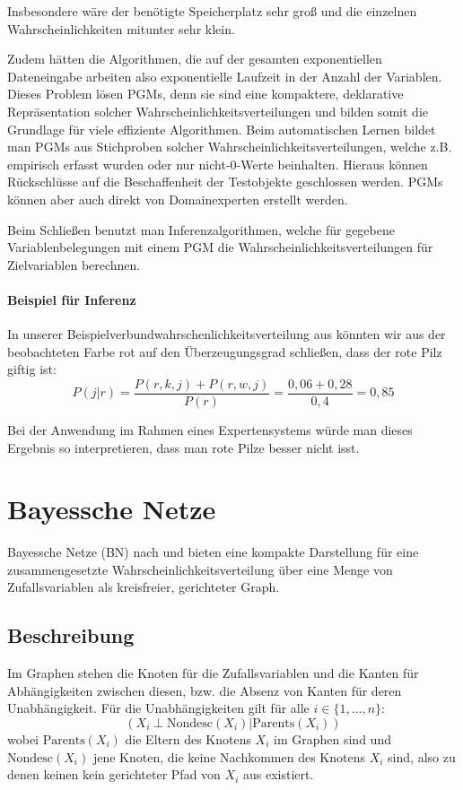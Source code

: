 \documentclass{llncs}
\begin{document}
Insbesondere wäre der benötigte Speicherplatz sehr groß und die einzelnen Wahrscheinlichkeiten mitunter sehr klein. 

Zudem hätten die Algorithmen, die auf der gesamten exponentiellen Dateneingabe arbeiten also exponentielle Laufzeit in der Anzahl der Variablen. Dieses Problem lösen PGMs, denn sie sind eine kompaktere, deklarative Repräsentation solcher Wahrscheinlichkeitsverteilungen und bilden somit die Grundlage für viele effiziente Algorithmen. Beim automatischen Lernen bildet man PGMs aus Stichproben solcher Wahrscheinlichkeitsverteilungen, welche z.B. empirisch erfasst wurden oder nur nicht-$0$-Werte beinhalten. Hieraus können Rückschlüsse auf die Beschaffenheit der Testobjekte geschlossen werden. PGMs können aber auch direkt von Domainexperten erstellt werden. 

Beim Schließen benutzt man Inferenzalgorithmen, welche für gegebene Variablenbelegungen mit einem PGM die Wahrscheinlichkeitsverteilungen für Zielvariablen berechnen. 

\paragraph{Beispiel für Inferenz} In unserer Beispielverbundwahrschenlichkeitsverteilung aus  könnten wir aus der beobachteten Farbe rot auf den Überzeugungsgrad schließen, dass der rote Pilz giftig ist:
\[P(j|r) = \frac{P(r,k,j)+P(r,w,j)}{P(r)} = \frac{0,06+0,28}{0,4} = 0,85\]

Bei der Anwendung im Rahmen eines Expertensystems würde man dieses Ergebnis so interpretieren, dass man rote Pilze besser nicht isst. 

\section{Bayessche Netze}

Bayessche Netze (BN) nach \cite{pearl1988probabilistic} und \cite{koller2009probabilistic} bieten eine kompakte Darstellung für eine zusammengesetzte Wahrscheinlichkeitsverteilung über eine Menge von Zufallsvariablen als kreisfreier, gerichteter Graph. 

\subsection{Beschreibung}

Im Graphen stehen die Knoten für die Zufallsvariablen und die Kanten für Abhängigkeiten zwischen diesen, bzw. die Absenz von Kanten für deren Unabhängigkeit. Für die Unabhängigkeiten gilt für alle $i \in \{1,\dots,n\}$:
\[ ( X_i \perp \mbox{Nondesc}(X_i) | \mbox{Parents}(X_i) )\]
wobei $\mbox{Parents}(X_i)$ die Eltern des Knotens $X_i$ im Graphen sind und $\mbox{Nondesc}(X_i)$ jene Knoten, die keine Nachkommen des Knotens $X_i$ sind, also zu denen keinen kein gerichteter Pfad von $X_i$ aus existiert. 
\end{document}
